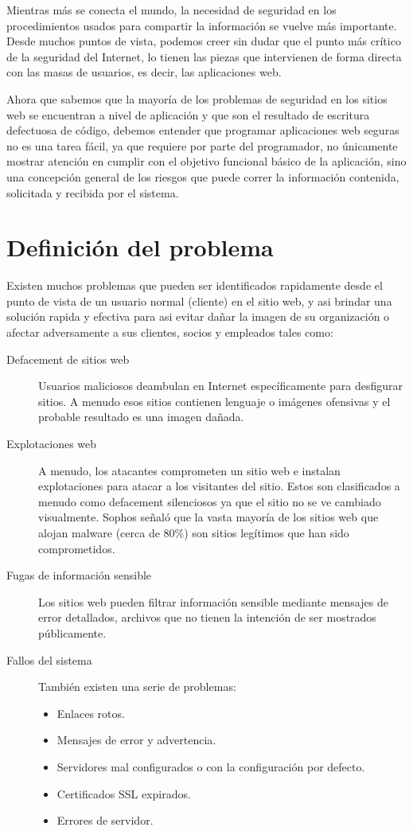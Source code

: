 \documentclass[letter,twoside,11pt]{article}
\begin{document}
Mientras más se conecta el mundo, la necesidad de seguridad en los
procedimientos usados para compartir la información se vuelve más importante.
Desde muchos puntos de vista, podemos creer sin dudar que el punto más crítico
de la seguridad del Internet, lo tienen las piezas que intervienen de forma
directa con las masas de usuarios, es decir, las aplicaciones web.

Ahora que sabemos que la mayoría de los problemas de seguridad en los sitios web
se encuentran a nivel de aplicación y que son el resultado de escritura
defectuosa de código, debemos entender que programar aplicaciones web seguras
no es una tarea fácil, ya que requiere por parte del programador, no únicamente
mostrar atención en cumplir con el objetivo funcional básico de la aplicación,
sino una concepción general de los riesgos que puede correr la información
contenida, solicitada y recibida por el sistema.

\section{Definición del problema}
Existen muchos problemas que pueden ser identificados rapidamente desde el punto
de vista de un usuario normal (cliente) en el sitio web, y asi brindar una
solución rapida y efectiva para asi evitar dañar la imagen de su organización o
afectar adversamente a sus clientes, socios y empleados tales como:

\begin{description}
    \item [Defacement de sitios web] Usuarios maliciosos deambulan en Internet
        específicamente para desfigurar sitios. A menudo esos sitios contienen
        lenguaje o imágenes ofensivas y el probable resultado es una imagen
        dañada.
    \item [Explotaciones web] A menudo, los atacantes comprometen un sitio web e
        instalan explotaciones para atacar a los visitantes del sitio. Estos son
        clasificados a menudo como defacement silenciosos ya que el sitio no se
        ve cambiado visualmente. Sophos señaló que la vasta mayoría de los
        sitios web que alojan malware (cerca de 80\%) son sitios legítimos que
        han sido comprometidos.
    \item [Fugas de información sensible] Los sitios web pueden filtrar
        información sensible mediante mensajes de error detallados, archivos que
        no tienen la intención de ser mostrados públicamente.
    \item [Fallos del sistema] También existen una serie de problemas:
        \begin{itemize}
        \item Enlaces rotos.
        \item Mensajes de error y advertencia.
        \item Servidores mal configurados o con la configuración por defecto.
        \item Certificados SSL expirados.
        \item Errores de servidor.
        \end{itemize}
\end{description}
\end{document}
